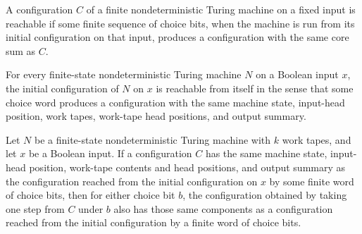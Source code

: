 \begin{definition}
\label{Randomized.PolyAmp.Reach}
\leanok
{}
A configuration $C$ of a finite nondeterministic Turing machine on a fixed input is
reachable if some finite sequence of choice bits, when the machine is run from its
initial configuration on that input, produces a configuration with the same core sum as
$C$.
\end{definition}

\begin{theorem}
\label{Randomized.PolyAmp.reach_init}
\leanok
{}
For every finite-state nondeterministic Turing machine $N$ on a Boolean input $x$, the
initial configuration of $N$ on $x$ is reachable from itself in the sense that some
choice word produces a configuration with the same machine state, input-head position,
work tapes, work-tape head positions, and output summary.
\end{theorem}

\begin{theorem}
\label{Randomized.PolyAmp.Reach.step}
\leanok
{}
Let $N$ be a finite-state nondeterministic Turing machine with $k$ work tapes, and let
$x$ be a Boolean input. If a configuration $C$ has the same machine state, input-head
position, work-tape contents and head positions, and output summary as the configuration
reached from the initial configuration on $x$ by some finite word of choice bits, then
for either choice bit $b$, the configuration obtained by taking one step from $C$ under
$b$ also has those same components as a configuration reached from the initial
configuration by a finite word of choice bits.
\end{theorem}

